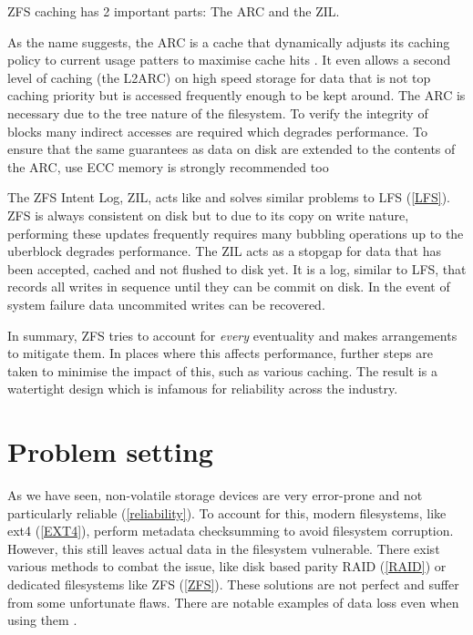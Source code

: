             ZFS caching has 2 important parts: The ARC and the ZIL.

            As the name suggests, the ARC is a cache that dynamically adjusts
            its caching policy to current usage patters to maximise cache hits
            \cite{ARC}. It even allows a second level of caching (the L2ARC) on
            high speed storage for data that is not top caching priority but is
            accessed frequently enough to be kept around. The ARC is necessary
            due to the tree nature of the filesystem. To verify the integrity
            of blocks many indirect accesses are required which degrades
            performance. To ensure that the same guarantees as data on disk are
            extended to the contents of the ARC, use ECC memory is strongly
            recommended too

            The ZFS Intent Log, ZIL, acts like and solves similar problems to
            LFS (\ref{LFS}). ZFS is always consistent on disk but to due to its
            copy on write nature, performing these updates frequently requires
            many bubbling operations up to the uberblock degrades performance.
            The ZIL acts as a stopgap for data that has been accepted, cached
            and not flushed to disk yet. It is a log, similar to LFS, that
            records all writes in sequence until they can be commit on disk. In
            the event of system failure data uncommited writes can be
            recovered.

            In summary, ZFS tries to account for \textit{every} eventuality and
            makes arrangements to mitigate them. In places where this affects
            performance, further steps are taken to minimise the impact of
            this, such as various caching. The result is a watertight design
            which is infamous for reliability across the industry.

\chapter{Problem setting}

    As we have seen, non-volatile storage devices are very error-prone and not
    particularly reliable (\ref{reliability}). To account for this, modern
    filesystems, like ext4 (\ref{EXT4}), perform metadata checksumming to avoid
    filesystem corruption. However, this still leaves actual data in the
    filesystem vulnerable. There exist various methods to combat the issue,
    like disk based parity RAID (\ref{RAID}) or dedicated filesystems like ZFS
    (\ref{ZFS}). These solutions are not perfect and suffer from some
    unfortunate flaws. There are notable examples of data loss even when using
    them \cite{LTT_data_loss}.

